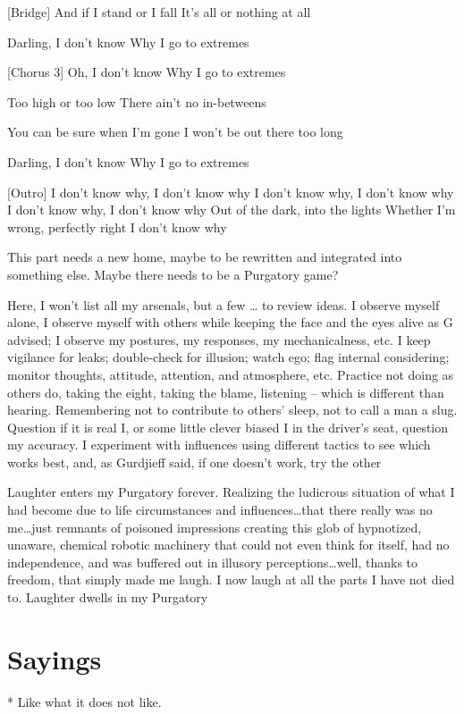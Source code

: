 \documentclass[12pt,letterpaper]{book}
\begin{document}
[Bridge]
And if I stand or I fall
It's all or nothing at all

Darling, I don't know
Why I go to extremes

[Chorus 3]
Oh, I don't know
Why I go to extremes

Too high or too low
There ain't no in-betweens

You can be sure when I'm gone
I won't be out there too long

Darling, I don't know
Why I go to extremes

[Outro]
I don't know why, I don't know why
I don't know why, I don't know why
I don't know why, I don't know why
Out of the dark, into the lights
Whether I'm wrong, perfectly right
I don't know why

This part needs a new home, maybe to be rewritten and integrated into something else. Maybe there needs to be a Purgatory game?

Here, I won’t list all my arsenals, but a few … to review ideas. I observe myself alone, I observe myself with others while keeping the face and the eyes alive as G advised; I observe my postures, my responses, my mechanicalness, etc. I keep vigilance for leaks; double-check for illusion; watch ego; flag internal considering; monitor thoughts, attitude, attention, and atmosphere, etc. Practice not doing as others do, taking the eight, taking the blame, listening – which is different than hearing. Remembering not to contribute to others’ sleep, not to call a man a slug. Question if it is real I, or some little clever biased I in the driver’s seat, question my accuracy. I experiment with influences using different tactics to see which works best, and, as Gurdjieff said, if one doesn’t work, try the other

Laughter enters my Purgatory forever. Realizing the ludicrous situation of what I had become due to life circumstances and influences…that there really was no me…just remnants of poisoned impressions creating this glob of hypnotized, unaware, chemical robotic machinery that could not even think for itself, had no independence, and was buffered out in illusory perceptions…well, thanks to freedom, that simply made me laugh. I now laugh at all the parts I have not died to. Laughter dwells in my Purgatory


\chapter{Sayings}
* Like what it does not like.
\end{document}
